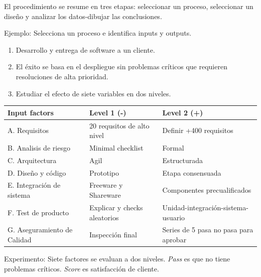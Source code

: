 \documentclass[]{article}
\begin{document}
El procedimiento se resume en tres etapas: seleccionar un proceso, seleccionar un diseño y analizar los datos-dibujar las conclusiones.

Ejemplo:
Selecciona un proceso e identifica inputs y outputs.
\begin{enumerate}
	\item Desarrollo y entrega de software a un cliente.
	\item El éxito se basa en el despliegue sin problemas críticos que requieren resoluciones de alta prioridad.
	\item Estudiar el efecto de siete variables en dos niveles.
\end{enumerate}

\begin{table}[H]
	\begin{center}
\begin{tabular}{|p{5cm}|p{5cm}|p{5cm}|}
	\hline Input factors & Level 1 (-) & Level 2 (+) \\
	\hline A. Requisitos & 20 requsitos de alto nivel & Definir +400 requisitos \\
	\hline B. Analisis de riesgo & Minimal checklist & Formal \\
	\hline C. Arquitectura & Agil & Estructurada \\
	\hline D. Diseño y código & Prototipo & Etapa consensuada \\
	\hline E. Integración de sistema & Freeware y Shareware & Componentes precualificados \\
	\hline F. Test de producto & Explicar y checks aleatorios & Unidad-integración-sistema-usuario \\
	\hline G. Aseguramiento de Calidad & Inspección final & Series de 5 pasa no pasa para aprobar \\
	\hline
\end{tabular}
\end{center}
\end{table}
Experimento: Siete factores se evaluan a dos niveles. \textit{Pass} es que no tiene problemas críticos. \textit{Score} es satisfacción de cliente.
\end{document}
